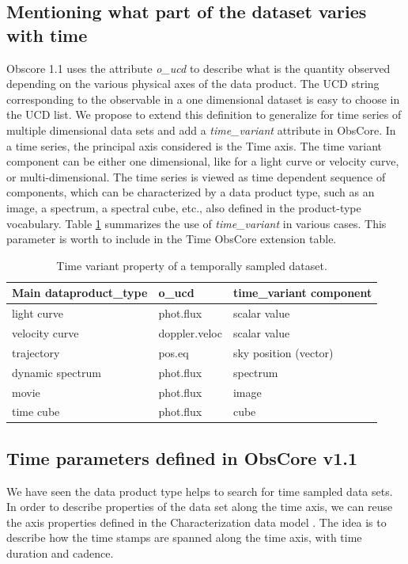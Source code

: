 \documentclass[11pt,a4paper]{ivoa}
\begin{document}
\subsection{Mentioning what part of the dataset varies with time }
\label{sec:timevariant}
Obscore 1.1 uses the attribute \emph{o\_ucd} to describe what is the quantity observed depending on the various physical axes of the data product. The  UCD string corresponding to the observable in  a one dimensional dataset is  easy to choose in the UCD list.  We propose to extend this definition to generalize for time series of multiple dimensional data sets and add a \emph{time\_variant} attribute in ObsCore.
In a time series, the principal axis considered is the Time axis. The time variant component can be either one dimensional, like for a light curve or velocity curve, or multi-dimensional. The time series is viewed as  time dependent sequence of components, which can be characterized  by a data product type, such as an image, a spectrum, a spectral cube, etc., also  defined in the product-type vocabulary. Table \ref{tab:timevar} summarizes the use of \emph{ time\_variant}  in various cases. 
This parameter is worth to include in the Time ObsCore extension table. 

\begin{table}[!htb]
   \begin{center}
  \caption{Time variant property of a temporally sampled dataset.  \label{tab:timevar} }
 
  \begin{small}
  \begin{tabular}{|l|l|l|}
\sptablerule
\textbf{Main dataproduct\_type} & \textbf{o\_ucd}  &\textbf{time\_variant component }   \\ \hline
light curve & phot.flux &  scalar value \\ \hline
velocity curve & doppler.veloc & scalar value \\ \hline 
trajectory & pos.eq  &  sky position (vector) \\ \hline
dynamic spectrum & phot.flux & spectrum \\ \hline
movie &   phot.flux & image \\ \hline
time cube & phot.flux & cube \\ \hline
 \end{tabular}
  \end{small}
  \end{center}
 \end{table} 
 
 \subsection{Time parameters defined in ObsCore v1.1}
 \label{sec:alreadythere}
 We have seen the data product type helps to search for time sampled data sets. 
 In order to describe properties of the data set along the time axis, we can reuse the axis properties defined in the Characterization data model \cite{2008ivoa.spec.0325L}.
 The idea is to describe how the time stamps are spanned along the time axis, with time duration and  cadence.
\end{document}
